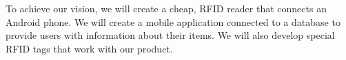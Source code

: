 To achieve our vision, we will create a cheap, RFID reader that connects an Android phone. We will create a mobile application connected to a database to provide users with information about their items. We will also develop special RFID tags that work with our product.
